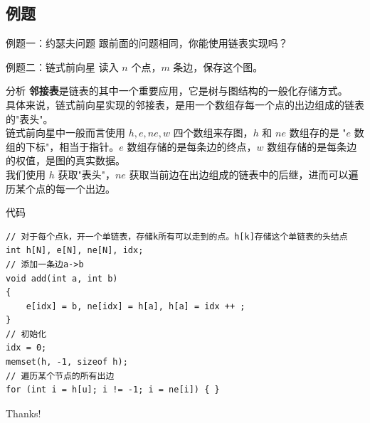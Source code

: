 \documentclass{beamer}
\begin{document}
\subsection{例题}
\begin{frame}{例题一：约瑟夫问题}
    跟前面的问题相同，你能使用链表实现吗？
\end{frame}

\begin{frame}{例题二：链式前向星}
    读入 $n$ 个点，$m$ 条边，保存这个图。
\end{frame}

\begin{frame}{分析}
    \textbf{邻接表}是链表的其中一个重要应用，它是树与图结构的一般化存储方式。\\

    具体来说，链式前向星实现的邻接表，是用一个数组存每一个点的出边组成的链表的"表头"。\\

    链式前向星中一般而言使用 $h, e, ne, w$ 四个数组来存图，$h$ 和 $ne$ 数组存的是 "$e$ 数组的下标"，相当于指针。$e$ 数组存储的是每条边的终点，$w$ 数组存储的是每条边的权值，是图的真实数据。\\

    我们使用 $h$ 获取"表头"，$ne$ 获取当前边在出边组成的链表中的后继，进而可以遍历某个点的每一个出边。
\end{frame}

\begin{frame}[fragile]{代码}
    \begin{verbatim}
// 对于每个点k，开一个单链表，存储k所有可以走到的点。h[k]存储这个单链表的头结点
int h[N], e[N], ne[N], idx;
// 添加一条边a->b
void add(int a, int b)
{
    e[idx] = b, ne[idx] = h[a], h[a] = idx ++ ;
}
// 初始化
idx = 0;
memset(h, -1, sizeof h);
// 遍历某个节点的所有出边
for (int i = h[u]; i != -1; i = ne[i]) { }
    \end{verbatim}
\end{frame}

\begin{frame}
    \begin{center}
        {\Huge\calligra Thanks!}
    \end{center}
\end{frame}
\end{document}
